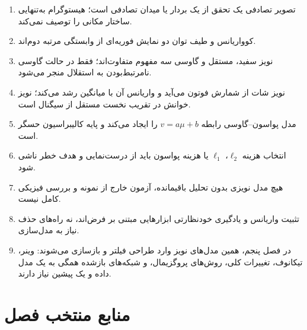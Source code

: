 \documentclass[12pt,openany,oneside]{book}
\begin{document}
\begin{summarybox}
\begin{enumerate}
\item تصویر تصادفی یک تحقق از یک بردار یا میدان تصادفی است؛ هیستوگرام به‌تنهایی ساختار مکانی را توصیف نمی‌کند.
\item کوواریانس و طیف توان دو نمایش فوریه‌ای از وابستگی مرتبه دوم‌اند.
\item نویز سفید، مستقل و گاوسی سه مفهوم متفاوت‌اند؛ فقط در حالت گاوسی نامرتبط‌بودن به استقلال منجر می‌شود.
\item نویز شات از شمارش فوتون می‌آید و واریانس آن با میانگین رشد می‌کند؛ نویز خوانش در تقریب نخست مستقل از سیگنال است.
\item مدل پواسون--گاوسی رابطه \(v=a\mu+b\) را ایجاد می‌کند و پایه کالیبراسیون حسگر است.
\item انتخاب هزینه \(\ell_2\)، \(\ell_1\) یا هزینه پواسون باید از درست‌نمایی و هدف خطر ناشی شود.
\item هیچ مدل نویزی بدون تحلیل باقیمانده، آزمون خارج از نمونه و بررسی فیزیکی کامل نیست.
\item تثبیت واریانس و یادگیری خودنظارتی ابزارهایی مبتنی بر فرض‌اند، نه راه‌های حذف نیاز به مدل‌سازی.
\item در فصل پنجم، همین مدل‌های نویز وارد طراحی فیلتر و بازسازی می‌شوند: وینر، تیکانوف، تغییرات کلی، روش‌های پروگزیمال،
 و شبکه‌های بازشده همگی به یک مدل داده و یک پیشین نیاز دارند.
\end{enumerate}
\end{summarybox}

\backmatter
\chapter*{منابع منتخب فصل}
\end{document}
